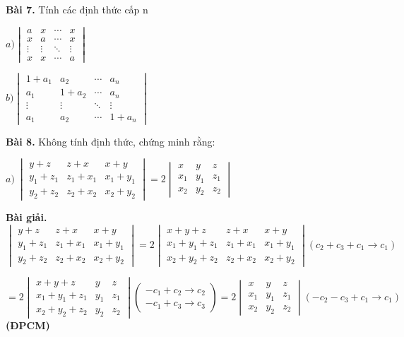 \documentclass[12pt]{report}
\begin{document}
\textbf{Bài 7.} Tính các định thức cấp n

$a) \begin{vmatrix} 
	a & x & \cdots & x \\ 
	x & a & \cdots & x \\ 
	\vdots & \vdots & \ddots & \vdots \\
	x & x & \cdots & a
\end{vmatrix}$

$b) \begin{vmatrix} 
1 + a_1 & a_2 & \cdots & a_n \\ 
a_1 & 1 + a_2 & \cdots & a_n \\ 
\vdots & \vdots & \ddots & \vdots \\
a_1 & a_2 & \cdots & 1+a_n
\end{vmatrix}$

\textbf{Bài 8.} Không tính định thức, chứng minh rằng:

$a)\ \begin{vmatrix}
y+z & z+x & x+y \\
y_1+z_1 & z_1+x_1 & x_1+y_1 \\
y_2+z_2 & z_2+x_2 & x_2+y_2
\end{vmatrix} = 2 \begin{vmatrix}
x & y & z \\
x_1 & y_1 & z_1 \\
x_2 & y_2 & z_2
\end{vmatrix}$

\textbf{Bài giải. }
$\begin{vmatrix}
	y+z & z+x & x+y \\
	y_1+z_1 & z_1+x_1 & x_1+y_1 \\
	y_2+z_2 & z_2+x_2 & x_2+y_2
\end{vmatrix} = 2\begin{vmatrix}
	x+y+z & z+x & x+y \\
	x_1+y_1+z_1 & z_1+x_1 & x_1+y_1 \\
	x_2+y_2+z_2 & z_2+x_2 & x_2+y_2
\end{vmatrix} (c_2 + c_3 + c_1 \to c_1)$

$= 2\begin{vmatrix}
	x+y+z & y & z \\
	x_1+y_1+z_1 & y_1 & z_1 \\
	x_2+y_2+z_2 & y_2 & z_2
\end{vmatrix} \left( \begin{smallmatrix}
	-c_1+c_2 \to c_2 \\ -c_1+c_3 \to c_3
\end{smallmatrix} \right) =2 \begin{vmatrix}
x & y & z \\
x_1 & y_1 & z_1 \\
x_2 & y_2 & z_2
\end{vmatrix} (-c_2 - c_3 + c_1 \to c_1)$ \textbf{(ĐPCM)}
\end{document}
